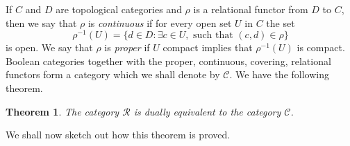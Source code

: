 \documentclass[a4paper]{amsart}
\newtheorem{theorem}{Theorem}[section]
\begin{document}
If $C$ and $D$ are topological categories and $\rho$ is a relational functor from $D$ to $C$,
then we say that $\rho$ is {\em continuous} if for every open set $U$ in $C$ the set 
$$\rho^{-1}(U) = \{d \in D \colon \exists c \in U, \text{ such that } (c,d) \in \rho \}$$
is open.
We say that $\rho$ is {\em proper} if $U$ compact implies that  $\rho^{-1}(U)$ is compact. 
Boolean categories together with the proper, continuous, covering, relational functors form a category which we shall denote by $\mathscr{C}$.
We have the following theorem.

\begin{theorem}\label{them:ruth} 
The category $\mathscr{R}$ is dually equivalent to the category $\mathscr{C}$.
\end{theorem}


We shall now sketch out how this theorem is proved.
\end{document}
